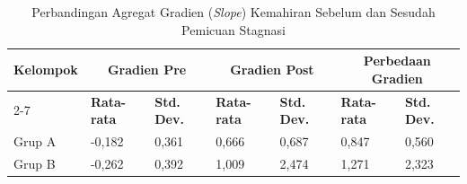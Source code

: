\begin{table}[!ht]
    \centering
    \caption{Perbandingan Agregat Gradien (\textit{Slope}) Kemahiran Sebelum dan Sesudah Pemicuan Stagnasi}
    \label{tbl:slope_agregat}
    \begin{tabular}{|p{2.8cm}|p{1.3cm}|p{1.6cm}|p{1.3cm}|p{1.6cm}|p{1.3cm}|p{1.6cm}|}
        \hline
        \textbf{Kelompok} & \multicolumn{2}{c|}{\textbf{Gradien Pre}} & \multicolumn{2}{c|}{\textbf{Gradien Post}} & \multicolumn{2}{c|}{\textbf{Perbedaan Gradien}} \\
        \cline{2-7}
        & \textbf{Rata-rata} & \textbf{Std. Dev.} & \textbf{Rata-rata} & \textbf{Std. Dev.} & \textbf{Rata-rata} & \textbf{Std. Dev.} \\
        \hline
        \hline
        Grup A & -0,182 & 0,361 & 0,666 & 0,687 & 0,847 & 0,560 \\
        \hline
        Grup B & -0,262 & 0,392 & 1,009 & 2,474 & 1,271 & 2,323 \\
        \hline
    \end{tabular}
\end{table}

